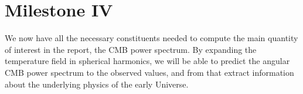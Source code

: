 \section{Milestone IV}\label{sec:M4}
We now have all the necessary constituents needed to compute the main quantity of interest in the report, the CMB power spectrum. By expanding the temperature field in spherical harmonics, we will be able to predict the angular CMB power spectrum to the observed values, and from that extract information about the underlying physics of the early Universe.  




 